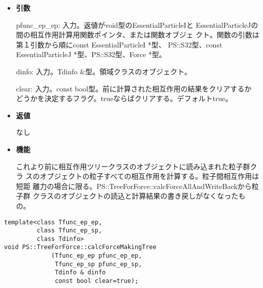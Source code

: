\begin{itemize}

\item {\bf 引数}

pfunc\_ep\_ep: 入力。返値がvoid型のEssentialParticleIと
EssentialParticleJの間の相互作用計算用関数ポインタ、または関数オブジェ
クト。関数の引数は第１引数から順にconst EssentialParticleI *型、
PS::S32型、const EssentialParticleJ *型、PS::S32型、Force *型。

dinfo: 入力。Tdinfo \&型。領域クラスのオブジェクト。

clear: 入力。const bool型。前に計算された相互作用の結果をクリアするか
どうかを決定するフラグ。trueならばクリアする。デフォルトtrue。

\item {\bf 返値}

なし

\item {\bf 機能}

これより前に相互作用ツリークラスのオブジェクトに読み込まれた粒子群クラ
スのオブジェクトの粒子すべての相互作用を計算する。粒子間相互作用は短距
離力の場合に限る。PS::TreeForForce::calcForceAllAndWriteBackから粒子群
クラスのオブジェクトの読込と計算結果の書き戻しがなくなったもの。

\end{itemize}

\begin{screen}
\begin{verbatim}
template<class Tfunc_ep_ep,
         class Tfunc_ep_sp,
         class Tdinfo>
void PS::TreeForForce::calcForceMakingTree
             (Tfunc_ep_ep pfunc_ep_ep,
              Tfunc_ep_sp pfunc_ep_sp,
              Tdinfo & dinfo
              const bool clear=true);
\end{verbatim}
\end{screen}

